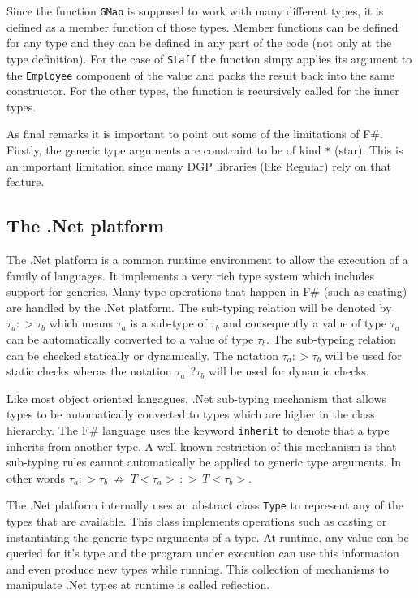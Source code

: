 \documentclass{sigplanconf}
\begin{document}
Since the function \verb+GMap+ is supposed to work with many different
types, it is defined as a member function of those types. Member
functions can be defined for any type and they can be defined in any
part of the code (not only at the type definition). For the case of
\verb+Staff+ the function simpy applies its argument to the
\verb+Employee+ component of the value and packs the result back into
the same constructor. For the other types, the function is recursively
called for the inner types.

As final remarks it is important to point out some of the limitations
of F\#. Firstly, the generic type arguments are constraint to be of
kind \verb+*+ (star). This is an important limitation since many DGP
libraries (like Regular) rely on that feature.

\subsection{The .Net platform}
The .Net platform is a common runtime environment to allow the
execution of a family of languages. It implements a very rich type
system which includes support for generics. Many type operations that
happen in F\# (such as casting) are handled by the .Net platform. The
sub-typing relation will be denoted by $\tau_a :> \tau_b$ which means
$\tau_a$ is a sub-type of $\tau_b$ and consequently a value of type
$\tau_a$ can be automatically converted to a value of type
$\tau_b$. The sub-typeing relation can be checked statically or
dynamically. The notation $\tau_a :> \tau_b$ will be used for static
checks wheras the notation $\tau_a :? \tau_b$ will be used for dynamic
checks.

Like most object oriented langagues, .Net sub-typing mechanism that
allows types to be automatically converted to types which are higher
in the class hierarchy. The F\# language uses the keyword
\verb+inherit+ to denote that a type inherits from another type. A
well known restriction of this mechanism is that sub-typing rules
cannot automatically be applied to generic type arguments. In other
words $\tau_a :> \tau_b\ \not\Rightarrow\ T<\tau_a> \ :> \ T<\tau_b>$.

The .Net platform internally uses an abstract class \verb+Type+ to
represent any of the types that are available. This class implements
operations such as casting or instantiating the generic type arguments
of a type. At runtime, any value can be queried for it's type and the
program under execution can use this information and even produce new
types while running. This collection of mechanisms to manipulate .Net
types at runtime is called reflection.
\end{document}
